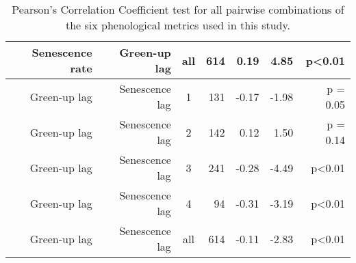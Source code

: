 \begin{table}[H]
\begin{tabular}{rrcrrrr}
  Senescence rate & Green-up lag & all & 614 & 0.19 & 4.85 & p<0.01 \\ 
   \hline
Green-up lag & Senescence lag & 1 & 131 & -0.17 & -1.98 & p = 0.05 \\ 
  Green-up lag & Senescence lag & 2 & 142 & 0.12 & 1.50 & p = 0.14 \\ 
  Green-up lag & Senescence lag & 3 & 241 & -0.28 & -4.49 & p<0.01 \\ 
  Green-up lag & Senescence lag & 4 &  94 & -0.31 & -3.19 & p<0.01 \\ 
  Green-up lag & Senescence lag & all & 614 & -0.11 & -2.83 & p<0.01 \\ 
   \hline
\end{tabular}
\caption{Pearson's Correlation Coefficient test for all pairwise combinations of the six phenological metrics used in this study.} 
\label{phen:phen_corr}
\end{table}

